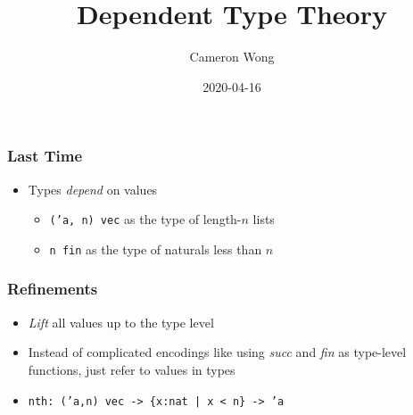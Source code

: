 \documentclass[usenames,dvipsnames]{beamer}
\title[Dependent Types]{Dependent Type Theory} %
\author{Cameron Wong} %
\institute[98-317] %
{98-317 Hype For Types}
\date{2020-04-16} %
\begin{document}
\begin{frame}
\titlepage %
\end{frame}




\begin{frame}
  \frametitle{Last Time}

  \begin{itemize}
    \item Types \emph{depend} on values
    \begin{itemize}
      \item \texttt{('a, n) vec} as the type of length-$n$ lists
      \item \texttt{n fin} as the type of naturals less than $n$
    \end{itemize}
  \end{itemize}

\end{frame}


\begin{frame}
  \frametitle{Refinements}
  \begin{itemize}
    \item \emph{Lift} all values up to the type level
    \item Instead of complicated encodings like using \emph{succ} and
      \emph{fin} as type-level functions, just refer to values in types
    \item \texttt{nth: ('a,n) vec -> \{x:nat | x < n\} -> 'a}
  \end{itemize}
\end{frame}
\end{document}
